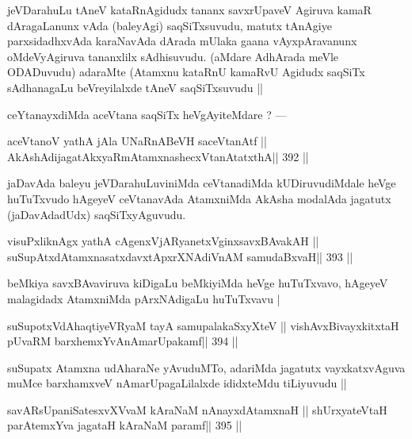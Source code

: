 \begin{artha}
jeVDarahuLu tAneV kataRnAgidudx tananx savxrUpaveV Agiruva kamaR dAragaLanunx vAda (baleyAgi) saqSiTxsuvudu, matutx tAnAgiye parxsidadhxvAda karaNavAda dArada mUlaka gaana vAyxpAravanunx oMdeVyAgiruva tananxlilx sAdhisuvudu. (aMdare AdhArada meVle ODADuvudu) adaraMte (Atamxnu kataRnU kamaRvU Agidudx saqSiTx sAdhanagaLu beVreyilalxde tAneV saqSiTxsuvudu ||
\end{artha}

\begin{artha}
ceYtanayxdiMda aceVtana saqSiTx heVgAyiteMdare ? ---
\end{artha}

\begin{shl}
aceVtanoV yathA jAla UNaRnABeVH saceVtanAtf ||
AkAshAdijagatAkxyaRmAtamxnashecxVtanAtatxthA\hfill || 392 ||
\end{shl}

\begin{artha}
jaDavAda baleyu jeVDarahuLuviniMda ceVtanadiMda kUDiruvudiMdale heVge huTuTxvudo hAgeyeV ceVtanavAda AtamxniMda AkAsha modalAda jagatutx (jaDavAdadUdx) saqSiTxyAguvudu.
\end{artha}

\begin{shl}
visuPxliknAgx yathA cAgenxVjARyanetxV\s ginxsavxBAvakAH ||
suSupAtxdAtamxnasatxdavxtApxrXNAdiVnAM samudaBxvaH\hfill || 393 ||
\end{shl}

\begin{artha}
beMkiya savxBAvaviruva kiDigaLu beMkiyiMda heVge huTuTxvavo, hAgeyeV malagidadx AtamxniMda pArxNAdigaLu huTuTxvavu |
\end{artha}

\begin{shl}
suSupotxVdAhaqtiyeVRyaM tayA samupalakaSxyXteV ||
vishAvxBivayxkitxtaH pUvaRM barxhemxYvAnAmarUpakamf\hfill || 394 ||
\end{shl}

\begin{artha}
suSupatx Atamxna udAharaNe yAvuduMTo, adariMda jagatutx vayxkatxvAguva muMce barxhamxveV nAmarUpagaLilalxde ididxteMdu tiLiyuvudu ||
\end{artha}

\begin{shl}
savARsUpaniSatesxvXVvaM kAraNaM nAnayxdAtamxnaH ||
shUrxyateV\s taH parAtemxYva jagataH kAraNaM paramf\hfill || 395 ||
\end{shl}

